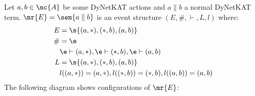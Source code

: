 \begin{example}
    Let $a,b\in \mc{A}$ be some DyNetKAT actions and $a\parallel b$ a
    normal DyNetKAT term.
    $\mr{E} = \sem{a\parallel b}$ is an event structure
    $(E,\#,\vdash,L,l)$ where:
    \begin{align*}
        E  & = \s{(a,*),(*,b),(a,b)}                           \\
        \# & = \e                                              \\
           & \e \vdash (a,*), \e \vdash (*,b),\e \vdash (a,b)  \\
        L  & = \s{(a,*),(*,b),(a,b)}                           \\
           & l((a,*)) = (a,*), l((*,b)) = (*,b),l((a,b))=(a,b) 
    \end{align*}
    The following diagram shows configurations of $\mr{E}$:
    \begin{center}
    \end{center}
\end{example}